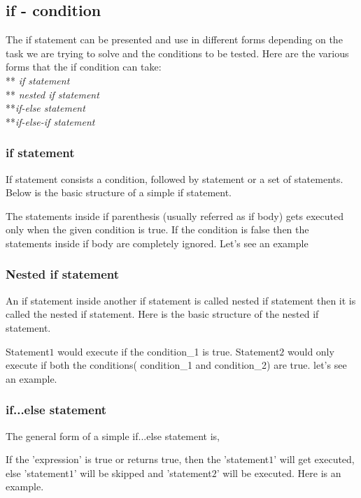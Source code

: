 \documentclass[11pt, a4paper]{article}
\begin{document}
\subsection{if - condition}
The if statement can be presented and use in different forms depending on the task we are trying to solve
and the conditions to be tested. Here are the various forms that the if condition can take:\\
** \textit{if statement}\\ ** \textit{nested if statement}\\ **\textit{if-else statement}\\
**\textit{if-else-if statement}\\

\subsubsection{if statement}
If statement consists a condition, followed by statement or a set of statements. Below is the basic structure
of a simple if statement.

The statements inside if parenthesis (usually referred as if body) gets executed only when
the given condition is true. If the condition is false then the statements inside if body
are completely ignored. Let's see an example


\subsubsection{Nested if statement}
An if statement inside another if statement is called nested if statement then it is called
the nested if statement. Here is the basic structure of the nested if statement.

Statement$1$ would execute if the condition\_1 is true. Statement$2$ would only execute
if both the conditions( condition\_1 and condition\_2) are true. let's see an example.


\subsubsection{if...else statement}
The general form of a simple if...else statement is,

If the 'expression' is true or returns true, then the 'statement$1$' will get executed,
else 'statement$1$' will be skipped and 'statement$2$' will be executed. Here is an example.

\end{document}
